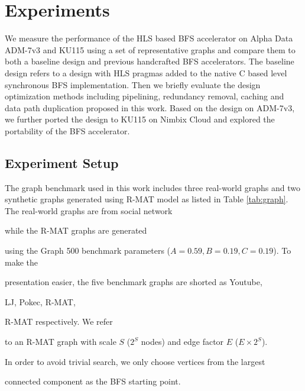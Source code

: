 \section{Experiments} \label{sec:experiment}

We measure the performance of the HLS based BFS 
accelerator on Alpha Data ADM-7v3 and KU115 using a set of 
representative graphs and compare them to both a 
baseline design and previous handcrafted BFS accelerators. 
The baseline design refers to a design with HLS pragmas 
added to the native C based level synchronous BFS implementation. 
Then we briefly evaluate the design optimization 
methods including pipelining, redundancy removal, 
caching and data path duplication 
proposed in this work. Based on the design on ADM-7v3, 
we further ported the design 
to KU115 on Nimbix Cloud and explored the portability of the 
BFS accelerator. 



\subsection{Experiment Setup}
The graph benchmark used in this work includes three real-world graphs and 
two synthetic graphs generated using R-MAT model \cite{chakrabarti2004rmat} 
as listed in Table \ref{tab:graph}. The real-world graphs are from social network 

\cite{snapnets} while the R-MAT graphs are generated 

using the Graph 500 benchmark parameters ($A=0.59, B=0.19, C=0.19$). To make the 

presentation easier, the five benchmark graphs are shorted as Youtube, 

LJ, Pokec, R-MAT\uppercase\expandafter{}, 

R-MAT\uppercase\expandafter{} respectively. We refer 

to an R-MAT graph with scale $S$ ($2^{S}$ nodes) and edge factor $E$ ($E\times 2^{S}$). 

In order to avoid trivial search, we only choose vertices from the largest 

connected component as the BFS starting point.



